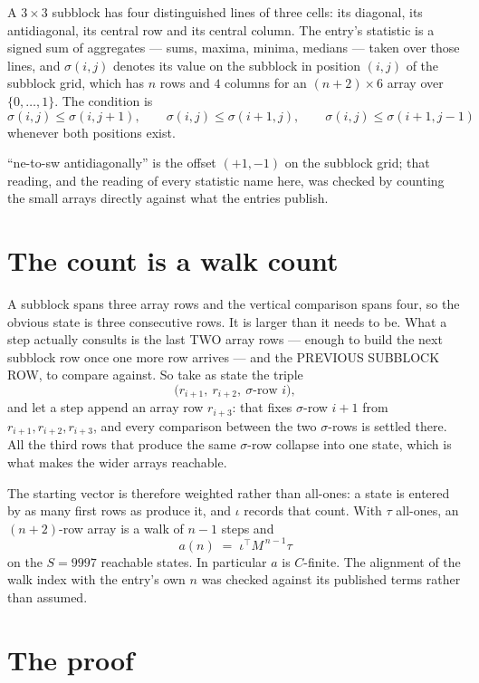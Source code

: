 \documentclass[11pt,a4paper]{article}
\theoremstyle{plain}
\theoremstyle{definition}
\begin{document}
A $3\times3$ subblock has four distinguished lines of three cells: its diagonal, its
antidiagonal, its central row and its central column. The entry's statistic is a signed sum of
aggregates --- sums, maxima, minima, medians --- taken over those lines, and $\sigma(i,j)$
denotes its value on the subblock in position $(i,j)$ of the subblock grid, which has $n$ rows
and $4$ columns for an $(n+2)\times6$ array over $\{0,\dots,1\}$. The condition is
\[
\sigma(i,j)\le\sigma(i,j+1),\qquad \sigma(i,j)\le\sigma(i+1,j),\qquad \sigma(i,j)\le\sigma(i+1,j-1)
\]
whenever both positions exist.

``ne-to-sw antidiagonally'' is the offset $(+1,-1)$ on the subblock grid; that reading, and
the reading of every statistic name here, was checked by counting the small arrays directly
against what the entries publish.

\section{The count is a walk count}

A subblock spans three array rows and the vertical comparison spans four, so the obvious state
is three consecutive rows. It is larger than it needs to be. What a step actually consults is
the last TWO array rows --- enough to build the next subblock row once one more row arrives ---
and the PREVIOUS SUBBLOCK ROW, to compare against. So take as state the triple
\[
\bigl(r_{i+1},\ r_{i+2},\ \sigma\text{-row }i\bigr),
\]
and let a step append an array row $r_{i+3}$: that fixes $\sigma$-row $i+1$ from
$r_{i+1},r_{i+2},r_{i+3}$, and every comparison between the two $\sigma$-rows is settled
there. All the third rows that produce the same $\sigma$-row collapse into one state, which is
what makes the wider arrays reachable.

The starting vector is therefore weighted rather than all-ones: a state is entered by as many
first rows as produce it, and $\iota$ records that count. With $\tau$ all-ones, an
$(n+2)$-row array is a walk of $n-1$ steps and
\[
a(n)\;=\;\iota^{\!\top}M^{\,n-1}\tau
\]
on the $S=9997$ reachable states. In particular $a$ is $C$-finite. The alignment of the walk
index with the entry's own $n$ was checked against its published terms rather than assumed.

\section{The proof}
\end{document}
